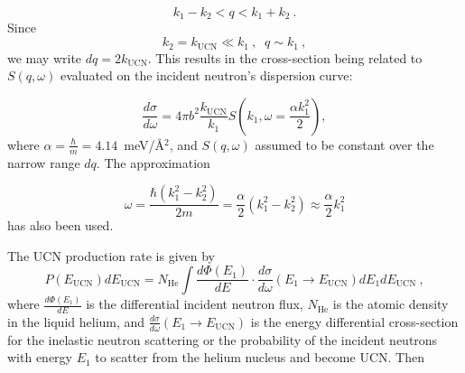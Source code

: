 \begin{equation}
  k_1-k_2 < q < k_1+k_2~.
\end{equation}
Since
\begin{equation}
k_2=k_{\text{UCN}} \ll k_1~, \; \; q\sim k_1~,
\end{equation}
we may write $dq=2k_{\text{UCN}}$. This results in the cross-section
being related to $S(q,\omega)$ evaluated on the incident neutron's
dispersion curve:

\begin{equation}
\frac{d\sigma}{d\omega}=4\pi b^2 \frac{k_{\text{UCN}}}{k_1}S \left(
k_1, \omega=\frac{\alpha k_1^2}{2} \right),
\end{equation}
where $\alpha=\frac{\hbar}{m}=4.14$~meV/\AA$^2$, and $S(q,\omega)$
assumed to be constant over the narrow range $dq$. The approximation

\begin{equation}
\omega=\frac{\hbar (k_1^2-k_2^2)}{2m}=\frac{\alpha}{2} (k_1^2 -
k_2^2)\approx \frac{\alpha}{2}k_1^2
\end{equation}
has also been used.

The UCN production rate is given by
\begin{equation}
\label{UCN_production}
P(E_{\text{UCN}}) dE_{\text{UCN}} = N_{\text{He}} \int \frac{d\Phi
  (E_1)}{dE}\cdot \frac{d \sigma}{d \omega}(E_1 \rightarrow
E_{\text{UCN}}) dE_1 dE_{\text{UCN}}~,
\end{equation}
where $\frac{d\Phi (E_1)}{dE}$ is the differential incident neutron
flux, $N_{\text{He}}$ is the atomic density in the liquid helium, and
$\frac{d \sigma}{d \omega}(E_1 \rightarrow E_{\text{UCN}})$ is the
energy differential cross-section for the inelastic neutron scattering
or the probability of the incident neutrons with energy $E_1$ to
scatter from the helium nucleus and become UCN.  Then

